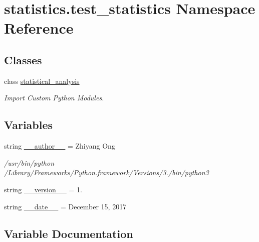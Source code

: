 \hypertarget{namespacestatistics_1_1test__statistics}{}\section{statistics.\+test\+\_\+statistics Namespace Reference}
\label{namespacestatistics_1_1test__statistics}
\subsection*{Classes}
\begin{DoxyCompactItemize}
\item 
class \hyperlink{classstatistics_1_1test__statistics_1_1statistical__analysis}{statistical\+\_\+analysis}
\begin{DoxyCompactList}\small\item\em Import Custom Python Modules. \end{DoxyCompactList}\end{DoxyCompactItemize}
\subsection*{Variables}
\begin{DoxyCompactItemize}
\item 
string \hyperlink{namespacestatistics_1_1test__statistics_a188ace18635f13c413bf14347b4eb7f0}{\+\_\+\+\_\+author\+\_\+\+\_\+} = \textquotesingle{}Zhiyang Ong\textquotesingle{}
\begin{DoxyCompactList}\small\item\em /usr/bin/python /\+Library/\+Frameworks/\+Python.framework/\+Versions/3./bin/python3 \end{DoxyCompactList}\item 
string \hyperlink{namespacestatistics_1_1test__statistics_ad5c236202b813efcbc877e38a20d7f07}{\+\_\+\+\_\+version\+\_\+\+\_\+} = \textquotesingle{}1.\textquotesingle{}
\item 
string \hyperlink{namespacestatistics_1_1test__statistics_a271285b175d250f7888c9b41fa124abd}{\+\_\+\+\_\+date\+\_\+\+\_\+} = \textquotesingle{}December 15, 2017\textquotesingle{}
\end{DoxyCompactItemize}


\subsection{Variable Documentation}
\hypertarget{namespacestatistics_1_1test__statistics_a188ace18635f13c413bf14347b4eb7f0}{}
